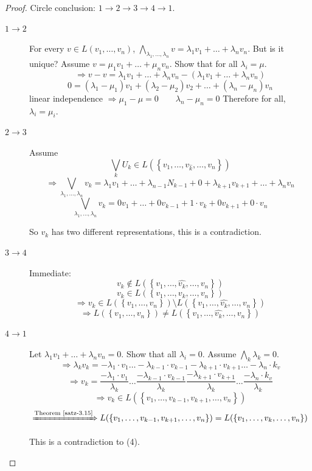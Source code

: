 \documentclass[a4paper,landscape,twocolumn]{article}
\newcommand\set[1]{\left\{#1\right\}}
\begin{document}
\begin{proof}
  Circle conclusion: $1 \rightarrow 2 \rightarrow 3 \rightarrow 4 \rightarrow 1$.

  \begin{description}
    \item[$1 \rightarrow 2$]
      For every $v \in L(v_1, \ldots, v_n)$, $\bigwedge_{\lambda_1, \ldots, \lambda_n} v = \lambda_1 v_1 + \ldots + \lambda_n v_n$.
      But is it unique? Assume $v = \mu_1 v_1 + \ldots + \mu_n v_n$.
      Show that for all $\lambda_i = \mu$.
      \[ \Rightarrow v - v = \lambda_1 v_1  + \ldots + \lambda_n v_n - (\lambda_1 v_1 + \ldots + \lambda_n v_n) \]
      \[ 0 = (\lambda_1 - \mu_1) v_1 + (\lambda_2 - \mu_2) v_2 + \ldots + (\lambda_n - \mu_n) v_n \]
      linear independence $\Rightarrow \mu_1 - \mu = 0  \qquad \lambda_n - \mu_n = 0$
      Therefore for all, $\lambda_i = \mu_i$.

    \item[$2 \rightarrow 3$]
      Assume \[ \bigvee_k U_k \in L(\set{v_1, \ldots, v_{\hat{k}}, \ldots, v_n}) \]
      \[ \Rightarrow \bigvee_{\lambda_1, \ldots, \lambda_n} v_k = \lambda_1 v_1 + \ldots + \lambda_{n-1} N_{k-1} + 0 + \lambda_{k+1} v_{k+1} + \ldots + \lambda_n v_n \]
      \[ \bigvee_{\lambda_1, \ldots, \lambda_n} v_k = 0 v_1 + \ldots + 0 v_{k-1} + 1 \cdot v_k + 0 v_{k+1} + 0 \cdot v_n \]

      So $v_k$ has two different representations, this is a contradiction.

    \item[$3 \rightarrow 4$]
      Immediate:
      \[ v_k \not\in L(\set{v_1, \ldots, \hat{v_k}, \ldots, v_n}) \]
      \[ v_k \in L({\set{v_1, \ldots, v_k, \ldots, v_n}}) \]
      \[ \Rightarrow v_k \in L(\set{v_1, \ldots, v_n}) \setminus L(\set{v_1, \ldots, \hat{v_k}, \ldots, v_n}) \]
      \[ \Rightarrow L(\set{v_1, \ldots, v_n}) \neq L(\set{v_1, \ldots, \hat{v_k}, \ldots, v_n}) \]

    \item[$4 \rightarrow 1$]
      Let $\lambda_1 v_1 + \ldots + \lambda_n v_n = 0$.
      Show that all $\lambda_i = 0$.
      Assume $\bigwedge_{k} \lambda_k = 0$.
      \[
        \Rightarrow \lambda_k v_k =
          -\lambda_1 \cdot v_1
          \ldots
          -\lambda_{k-1} \cdot v_{k-1}
          -\lambda_{k+1} \cdot v_{k+1}
          \ldots
          -\lambda_{n} \cdot k_v
      \]
      \[
        \Rightarrow v_k =
          \frac{-\lambda_1 \cdot v_1}{\lambda_k}
          \ldots
          \frac{-\lambda_{k-1} \cdot v_{k-1}}{\lambda_k}
          \frac{-\lambda_{k+1} \cdot v_{k+1}}{\lambda_k}
          \ldots
          \frac{-\lambda_{n} \cdot k_v}{\lambda_k}
      \]
      \[ \Rightarrow v_k \in L(\set{v_1, \ldots, v_{k-1}, v_{k+1}, \ldots, v_n}) \]
      \[ \xRightarrow{\text{Theorem~\ref{satz-3.15}}} L(\set{v_1, \ldots, v_{k-1}, v_{k+1}, \ldots, v_n}) = L(\set{v_1, \ldots, v_k, \ldots, v_n}) \]

      This is a contradiction to (4).
  \end{description}
\end{proof}
\end{document}
